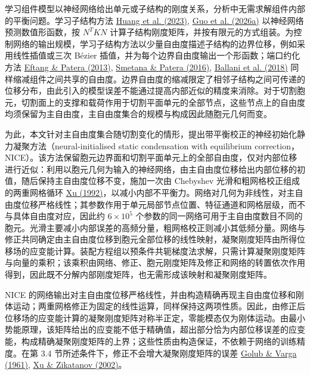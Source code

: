 \documentclass[preprint,12pt,authoryear]{elsarticle}
\begin{document}
学习组件模型以神经网络给出单元或子结构的刚度关系，分析中无需求解组件内部的平衡问题。学习子结构方法 \href{https://doi.org/10.1016/j.eml.2023.102041}{Huang et al. (2023)}, \href{https://doi.org/10.1016/j.cma.2026.118955}{Guo et al. (2026a)} 以神经网络预测数值形函数，按 \(N^TKN\) 计算子结构刚度矩阵，并按有限元的方式组装。为控制网络的输出规模，学习子结构方法以少量自由度描述子结构的边界位移，例如采用线性插值或三次 Bézier 插值，并为每个边界自由度输出一个形函数；端口约化方法 \href{https://doi.org/10.1002/nme.4543}{Eftang \& Patera (2013)}, \href{https://doi.org/10.1137/15m1009603}{Smetana \& Patera (2016)}, \href{https://doi.org/10.1016/j.cma.2017.09.014}{Ballani et al. (2018)} 同样缩减组件之间共享的自由度。边界自由度的缩减限定了相邻子结构之间可传递的位移分布，由此引入的模型误差不能通过提高内部近似的精度来消除。对于切割胞元，切割面上的支撑和载荷作用于切割平面单元的全部节点，这些节点上的自由度均须保留为主自由度，主自由度集合的规模与构成因此随胞元几何而变。

为此，本文针对主自由度集合随切割变化的情形，提出带平衡校正的神经初始化静力凝聚方法（neural-initialised static condensation with equilibrium correction，NICE）。该方法保留胞元边界面和切割平面单元上的全部自由度，仅对内部位移进行近似：利用以胞元几何为输入的神经网络，由主自由度位移给出内部位移的初值，随后保持主自由度位移不变，施加一次由 Chebyshev 光滑和粗网格校正组成的两重网格循环 \href{https://doi.org/10.1137/1034116}{Xu (1992)}，以减小内部不平衡力。网络对几何为非线性，对主自由度位移严格线性；其参数作用于单元局部节点位置、特征通道和网格层级，而不与具体自由度对应，因此约 \(6\times10^5\) 个参数的同一网络可用于主自由度数目不同的胞元。光滑主要减小内部误差的高频分量，粗网格校正则减小其低频分量。网络与修正共同确定由主自由度位移到胞元全部位移的线性映射，凝聚刚度矩阵由所得位移场的应变能计算。装配方程组以预条件共轭梯度法求解，只需计算凝聚刚度矩阵与向量的乘积；该乘积由网络、修正、胞元刚度矩阵及修正和网络的转置依次作用得到，因此既不分解内部刚度矩阵，也无需形成该映射和凝聚刚度矩阵。

NICE 的网络输出对主自由度位移严格线性，并由构造精确再现主自由度位移和刚体运动；两重网格修正为固定的线性运算，同样保持这两项性质。因此，由修正后位移场的应变能计算的凝聚刚度矩阵对称半正定，零能模态仅为刚体运动。由最小势能原理，该矩阵给出的应变能不低于精确值，超出部分恰为内部位移误差的应变能，构成精确凝聚刚度矩阵的上界；这些性质由构造保证，不依赖于网络的训练精度。在第 3.4 节所述条件下，修正不会增大凝聚刚度矩阵的误差 \href{https://doi.org/10.1007/BF01386013}{Golub \& Varga (1961)}, \href{https://doi.org/10.1090/S0894-0347-02-00398-3}{Xu \& Zikatanov (2002)}。
\end{document}
